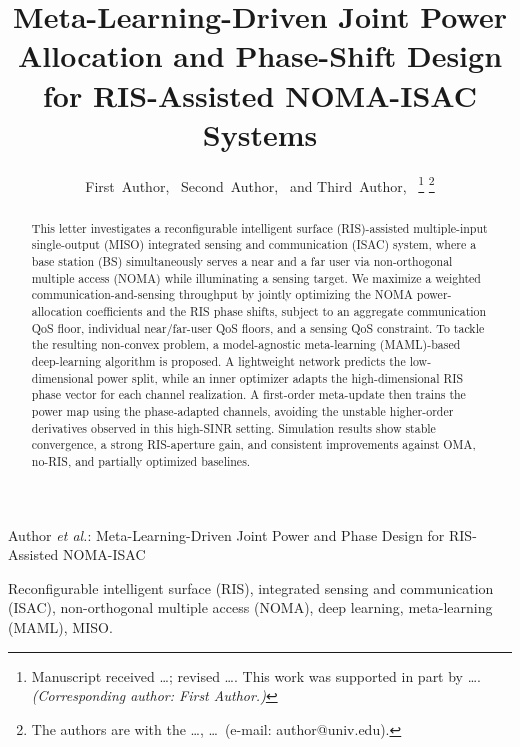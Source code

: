 \documentclass[10pt,journal]{IEEEtran}
\begin{document}
\title{Meta-Learning-Driven Joint Power Allocation and Phase-Shift Design
for RIS-Assisted NOMA-ISAC Systems}

\author{First~Author,~
        Second~Author,~
        and Third~Author,~
\thanks{Manuscript received \ldots; revised \ldots. This work was supported in
part by \ldots. \emph{(Corresponding author: First Author.)}}
\thanks{The authors are with the \ldots, \ldots\ (e-mail: author@univ.edu).}}

%
{Author \MakeLowercase{\textit{et al.}}: Meta-Learning-Driven Joint Power and Phase Design for RIS-Assisted NOMA-ISAC}

\maketitle

\begin{abstract}
This letter investigates a reconfigurable intelligent surface (RIS)-assisted
multiple-input single-output (MISO) integrated sensing and communication (ISAC)
system, where a base station (BS) simultaneously serves a near and a far user
via non-orthogonal multiple access (NOMA) while illuminating a sensing target.
We maximize a weighted communication-and-sensing throughput by jointly
optimizing the NOMA power-allocation coefficients and the RIS phase shifts,
subject to an aggregate communication QoS floor, individual near/far-user QoS
floors, and a sensing QoS constraint. To tackle the resulting non-convex problem,
a model-agnostic meta-learning (MAML)-based deep-learning algorithm is proposed.
A lightweight network predicts the low-dimensional power split, while an inner
optimizer adapts the high-dimensional RIS phase vector for each channel
realization. A first-order meta-update then trains the power map using the
phase-adapted channels, avoiding the unstable higher-order derivatives observed
in this high-SINR setting. Simulation results show
stable convergence, a strong RIS-aperture gain, and consistent improvements
against OMA, no-RIS, and partially optimized baselines.
\end{abstract}

\begin{IEEEkeywords}
Reconfigurable intelligent surface (RIS), integrated sensing and communication
(ISAC), non-orthogonal multiple access (NOMA), deep learning, meta-learning
(MAML), MISO.
\end{IEEEkeywords}
\end{document}
